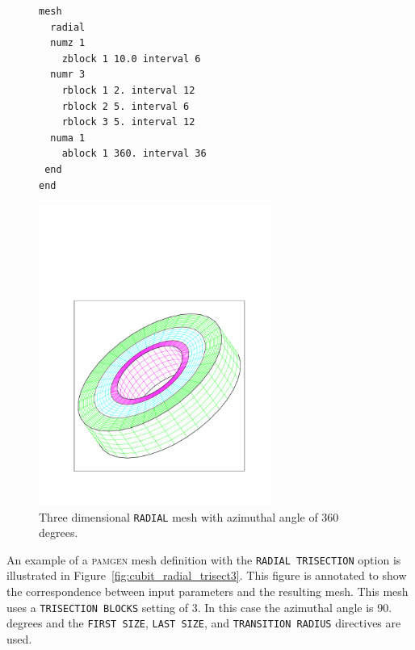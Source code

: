 \begin{figure}[htbp]
\centering
  \begin{minipage}[c]{0.4\linewidth}
    \centering
{\ttfamily \begin{verbatim}
mesh
  radial
  numz 1
    zblock 1 10.0 interval 6
  numr 3 
    rblock 1 2. interval 12
    rblock 2 5. interval 6
    rblock 3 5. interval 12
  numa 1
    ablock 1 360. interval 36
 end
end
\end{verbatim}}
  \end{minipage}%
  \hfil
  \begin{minipage}[c]{0.6\linewidth}
    \centering
      \includegraphics[width=3.0in]{cubit_radial2}
  \end{minipage}
  \caption [A 360 degree \texttt{RADIAL} mesh.]{Three dimensional \texttt{RADIAL} mesh with azimuthal
    angle of 360 degrees.}
  \label{fig:rect_cubit_radial2}
\end{figure}

An example of a \textsc{pamgen} mesh definition with the
\texttt{RADIAL TRISECTION} option is illustrated in
Figure~\ref{fig:cubit_radial_trisect3}. This figure is annotated to
show the correspondence between input parameters and the
resulting mesh. This mesh uses a \texttt{TRISECTION BLOCKS} setting of 3. In this case the azimuthal
angle is 90. degrees and the \texttt{FIRST SIZE}, \texttt{LAST SIZE},
 and \texttt{TRANSITION RADIUS} directives are used. 

